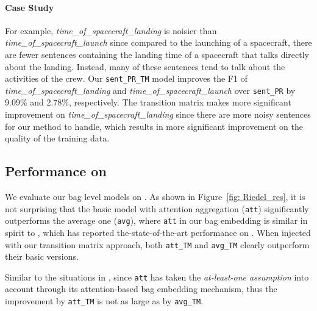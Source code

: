 \paragraph{Case Study}
 For example, \textit{time\_of\_spacecraft\_landing} is noisier than \textit{time\_of\_spacecraft\_launch} since compared to the launching of a spacecraft, there are fewer sentences containing the landing time of a spacecraft that talks directly about the landing. Instead, many of these sentences tend to talk about the activities of the crew. Our \texttt{sent\_PR\_TM} model improves the F1 of \textit{time\_of\_spacecraft\_landing} and \textit{time\_of\_spacecraft\_launch} over \texttt{sent\_PR} by 9.09\% and 2.78\%, respectively. 
The transition matrix makes more significant improvement on \textit{time\_of\_spacecraft\_landing} since there are more noisy sentences for our method to handle, which results in more significant improvement on the quality of the training data.


\subsection{Performance on \EntityRE}
We evaluate our bag level models on \EntityRE.
As shown in Figure~\ref{fig: Riedel_res}, it is not surprising that the basic model with attention aggregation (\texttt{att}) significantly outperforms the average one (\texttt{avg}), where \texttt{att}  in our bag embedding is similar in spirit to \cite{lin2016neural},
which has reported the-state-of-the-art performance on \EntityRE.
When injected with our transition matrix approach,  both \texttt{att\_TM} and \texttt{avg\_TM} clearly outperform their basic versions.

Similar to the situations in \TimeRE, since \texttt{att} has taken the \textit{at-least-one assumption} into account  through its attention-based bag embedding mechanism, thus the improvement by \texttt{att\_TM}  is not as large as by \texttt{avg\_TM}.

